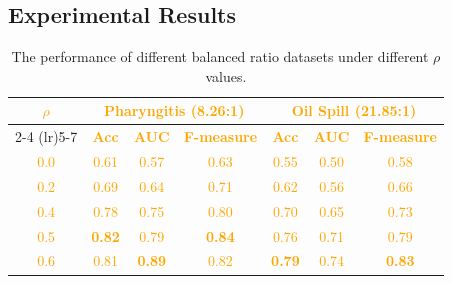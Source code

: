 \documentclass[journal,12pn, onecolumn]{IEEEtran}
\begin{document}
{{{{{{{\subsection{Experimental Results}

\begin{table}[h]
\centering
\caption{\color{orange}The performance of different balanced ratio datasets under different $\rho$ values.}
\label{tab:rho_sensitivity_updated}

\setlength{\tabcolsep}{4mm} %
\begin{tabular}{c c c c c c c}
\toprule
\multirow{2}{*}{\textcolor{orange}{\textbf{\large $\rho$}}} & \multicolumn{3}{c}{\textcolor{orange}{\textbf{Pharyngitis (8.26:1)}}} & \multicolumn{3}{c}{\textcolor{orange}{\textbf{Oil Spill (21.85:1)}}} \\
\cmidrule(lr){2-4} \cmidrule(lr){5-7}
& \textcolor{orange}{\textbf{Acc}} & \textcolor{orange}{\textbf{AUC}} & \textcolor{orange}{\textbf{F-measure}} & \textcolor{orange}{\textbf{Acc}} & \textcolor{orange}{\textbf{AUC}} & \textcolor{orange}{\textbf{F-measure}} \\
\midrule
\textcolor{orange}{0.0}    & \textcolor{orange}{0.61}     & \textcolor{orange}{0.57}               & \textcolor{orange}{0.63}            & \textcolor{orange}{0.55}     & \textcolor{orange}{0.50}               & \textcolor{orange}{0.58}            \\
\textcolor{orange}{0.2}    & \textcolor{orange}{0.69}     & \textcolor{orange}{0.64}               & \textcolor{orange}{0.71}            & \textcolor{orange}{0.62}     & \textcolor{orange}{0.56}               & \textcolor{orange}{0.66}            \\
\textcolor{orange}{0.4}    & \textcolor{orange}{0.78}     & \textcolor{orange}{0.75}               & \textcolor{orange}{0.80}            & \textcolor{orange}{0.70}     & \textcolor{orange}{0.65}               & \textcolor{orange}{0.73}            \\
\textcolor{orange}{0.5}    & \textcolor{orange}{\textbf{0.82}}     & \textcolor{orange}{0.79}               & \textcolor{orange}{\textbf{0.84}}           & \textcolor{orange}{0.76}     & \textcolor{orange}{0.71}               & \textcolor{orange}{0.79}            \\
\textcolor{orange}{0.6}    & \textcolor{orange}{0.81}     & \textcolor{orange}{\textbf{0.89}}             & \textcolor{orange}{0.82}            & \textcolor{orange}{\textbf{0.79}}    & \textcolor{orange}{0.74}               & \textcolor{orange}{\textbf{0.83}}            \\

\end{tabular}
\end{table}}}}}}}}
\end{document}
